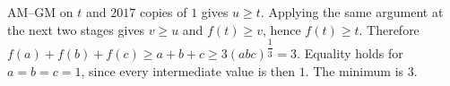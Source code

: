 AM--GM on $t$ and $2017$ copies of $1$ gives $u\ge t$. Applying the same argument at the next two stages gives $v\ge u$ and $f(t)\ge v$, hence $f(t)\ge t$. Therefore $f (a) + f (b) + f (c) \ge a + b + c \ge 3 (abc)^{\dfrac{1}{3}} = 3$. Equality holds for $a=b=c=1$, since every intermediate value is then $1$. The minimum is $\boxed3$.
